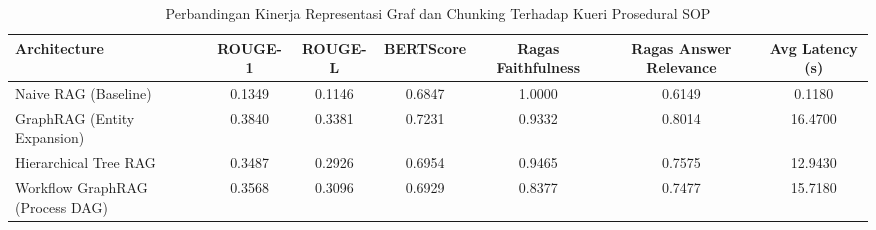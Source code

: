 \begin{table}
\caption{Perbandingan Kinerja Representasi Graf dan Chunking Terhadap Kueri Prosedural SOP}
\label{tab:sop_graph_chunking_comparison}
\begin{tabular}{lcccccc}
\toprule
Architecture & ROUGE-1 & ROUGE-L & BERTScore & Ragas Faithfulness & Ragas Answer Relevance & Avg Latency (s) \\
\midrule
Naive RAG (Baseline) & 0.1349 & 0.1146 & 0.6847 & 1.0000 & 0.6149 & 0.1180 \\
GraphRAG (Entity Expansion) & 0.3840 & 0.3381 & 0.7231 & 0.9332 & 0.8014 & 16.4700 \\
Hierarchical Tree RAG & 0.3487 & 0.2926 & 0.6954 & 0.9465 & 0.7575 & 12.9430 \\
Workflow GraphRAG (Process DAG) & 0.3568 & 0.3096 & 0.6929 & 0.8377 & 0.7477 & 15.7180 \\
\bottomrule
\end{tabular}
\end{table}
